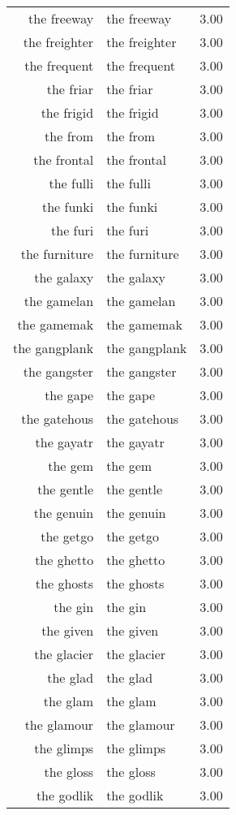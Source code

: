 \begin{table}[ht]
\begin{tabular}{rlr}
  the freeway & the freeway & 3.00 \\ 
  the freighter & the freighter & 3.00 \\ 
  the frequent & the frequent & 3.00 \\ 
  the friar & the friar & 3.00 \\ 
  the frigid & the frigid & 3.00 \\ 
  the from & the from & 3.00 \\ 
  the frontal & the frontal & 3.00 \\ 
  the fulli & the fulli & 3.00 \\ 
  the funki & the funki & 3.00 \\ 
  the furi & the furi & 3.00 \\ 
  the furniture & the furniture & 3.00 \\ 
  the galaxy & the galaxy & 3.00 \\ 
  the gamelan & the gamelan & 3.00 \\ 
  the gamemak & the gamemak & 3.00 \\ 
  the gangplank & the gangplank & 3.00 \\ 
  the gangster & the gangster & 3.00 \\ 
  the gape & the gape & 3.00 \\ 
  the gatehous & the gatehous & 3.00 \\ 
  the gayatr & the gayatr & 3.00 \\ 
  the gem & the gem & 3.00 \\ 
  the gentle & the gentle & 3.00 \\ 
  the genuin & the genuin & 3.00 \\ 
  the getgo & the getgo & 3.00 \\ 
  the ghetto & the ghetto & 3.00 \\ 
  the ghosts & the ghosts & 3.00 \\ 
  the gin & the gin & 3.00 \\ 
  the given & the given & 3.00 \\ 
  the glacier & the glacier & 3.00 \\ 
  the glad & the glad & 3.00 \\ 
  the glam & the glam & 3.00 \\ 
  the glamour & the glamour & 3.00 \\ 
  the glimps & the glimps & 3.00 \\ 
  the gloss & the gloss & 3.00 \\ 
  the godlik & the godlik & 3.00 \\ 

\end{tabular}
\end{table}
